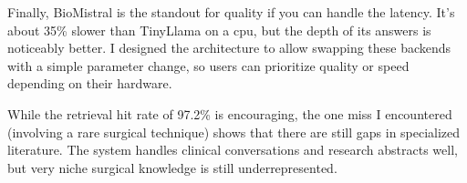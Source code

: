 Finally, BioMistral is the standout for quality if you can handle the latency. It's about 35\% slower than TinyLlama on a \ac{cpu}, but the depth of its answers is noticeably better. I designed the architecture to allow swapping these backends with a simple parameter change, so users can prioritize quality or speed depending on their hardware. 

While the retrieval hit rate of 97.2\% is encouraging, the one miss I encountered (involving a rare surgical technique) shows that there are still gaps in specialized literature. The system handles clinical conversations and research abstracts well, but very niche surgical knowledge is still underrepresented.
